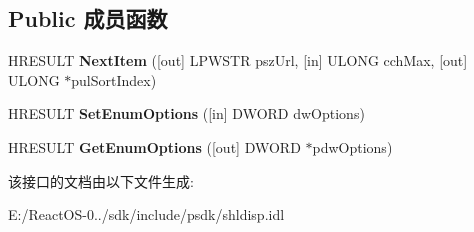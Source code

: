 \subsection*{Public 成员函数}
\begin{DoxyCompactItemize}
\item 
\mbox{\label{interface_i_enum_a_c_string_ab344dde41d4e6b17a76e2c254ecfd854}} 
H\+R\+E\+S\+U\+LT {\bfseries Next\+Item} (\mbox{[}out\mbox{]} L\+P\+W\+S\+TR psz\+Url, \mbox{[}in\mbox{]} U\+L\+O\+NG cch\+Max, \mbox{[}out\mbox{]} U\+L\+O\+NG $\ast$pul\+Sort\+Index)
\item 
\mbox{\label{interface_i_enum_a_c_string_ae853258154e539fa60368bc70ca91b09}} 
H\+R\+E\+S\+U\+LT {\bfseries Set\+Enum\+Options} (\mbox{[}in\mbox{]} D\+W\+O\+RD dw\+Options)
\item 
\mbox{\label{interface_i_enum_a_c_string_a1ca03771dbb3712e2402e8601797a556}} 
H\+R\+E\+S\+U\+LT {\bfseries Get\+Enum\+Options} (\mbox{[}out\mbox{]} D\+W\+O\+RD $\ast$pdw\+Options)
\end{DoxyCompactItemize}


该接口的文档由以下文件生成\+:\begin{DoxyCompactItemize}
\item 
E\+:/\+React\+O\+S-\/0../sdk/include/psdk/shldisp.\+idl\end{DoxyCompactItemize}
